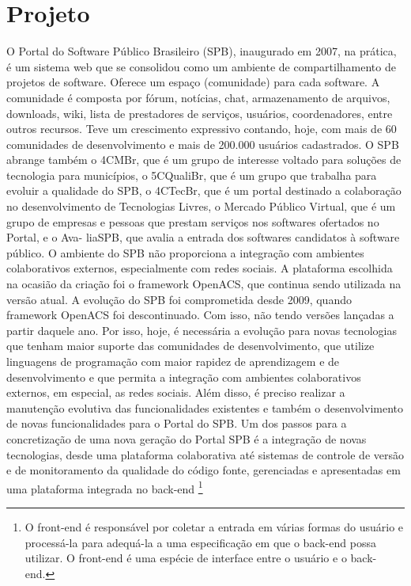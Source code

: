 \section{Projeto}
\label{sec:projeto}


O Portal do Software Público Brasileiro (SPB), inaugurado em 2007, na prática, é um sistema
web que se consolidou como um ambiente de compartilhamento de projetos de software.
Oferece um espaço (comunidade) para cada software. A comunidade é composta por fórum,
notícias, chat, armazenamento de arquivos, downloads, wiki, lista de prestadores de
serviços, usuários, coordenadores, entre outros recursos. Teve um crescimento expressivo
contando, hoje, com mais de 60 comunidades de desenvolvimento e mais de 200.000 usuários
cadastrados. O SPB abrange também o 4CMBr, que é um grupo de interesse voltado para
soluções de tecnologia para municípios, o 5CQualiBr, que é um grupo que trabalha para
evoluir a qualidade do SPB, o 4CTecBr, que é um portal destinado a
colaboração no desenvolvimento de Tecnologias Livres, o Mercado Público Virtual, que é um
grupo de empresas e pessoas que prestam serviços nos softwares ofertados no Portal, e o Ava- 
liaSPB, que avalia a entrada dos softwares candidatos à software público. O ambiente do 
SPB não proporciona a integração com ambientes colaborativos externos, especialmente com
redes sociais. A plataforma escolhida na ocasião da criação foi o framework OpenACS, que
continua sendo utilizada na versão atual.
%
A evolução do SPB foi comprometida desde 2009, quando framework OpenACS foi 
descontinuado. Com isso, não tendo versões lançadas a partir daquele ano. Por isso, hoje,
é necessária a evolução para novas tecnologias que tenham maior suporte das comunidades
de desenvolvimento, que utilize linguagens de programação com maior rapidez de aprendizagem e
de desenvolvimento e que permita a integração com ambientes colaborativos externos, em especial, as
redes sociais. Além disso, é preciso realizar a manutenção evolutiva das funcionalidades
existentes e também o desenvolvimento de novas funcionalidades para o Portal do SPB.
%
Um dos passos para a concretização de uma nova geração do Portal SPB é a integração de
novas tecnologias, desde uma plataforma colaborativa até sistemas de controle de versão e de
monitoramento da qualidade do código fonte, gerenciadas e apresentadas em uma plataforma
integrada no back-end \footnote{O front-end é responsável por coletar a entrada em várias formas do
usuário e processá-la para adequá-la a uma especificação em que o back-end possa utilizar. O front-end é uma espécie de interface entre o usuário e o back-end.} 
